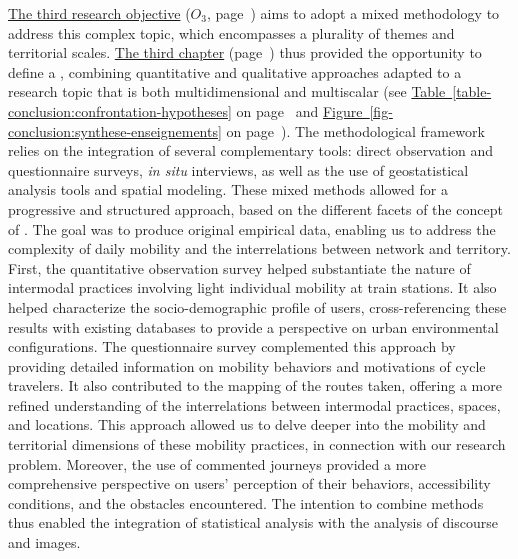 \begin{refsegment}
\hyperref[objectif-3]{The third research objective} (\(O_3\), page~\pageref{objectif-3}) aims to adopt a mixed methodology to address this complex topic, which encompasses a plurality of themes and territorial scales. \hyperref[chap3:titre]{The third chapter} (page~\pageref{chap3:titre}) thus provided the opportunity to define a , combining quantitative and qualitative approaches adapted to a research topic that is both multidimensional and multiscalar (see \hyperref[table-conclusion:confrontation-hypotheses]{Table~\ref{table-conclusion:confrontation-hypotheses}} on page~\pageref{table-conclusion:confrontation-hypotheses} and \hyperref[fig-conclusion:synthese-enseignements]{Figure~\ref{fig-conclusion:synthese-enseignements}} on page~\pageref{fig-conclusion:synthese-enseignements}). The methodological framework relies on the integration of several complementary tools: direct observation and questionnaire surveys, \textsl{in situ} interviews, as well as the use of geostatistical analysis tools and spatial modeling. These mixed methods allowed for a progressive and structured approach, based on the different facets of the concept of . The goal was to produce original empirical data, enabling us to address the complexity of daily mobility and the interrelations between network and territory. First, the quantitative observation survey helped substantiate the  nature of intermodal practices involving light individual mobility at train stations. It also helped characterize the socio-demographic profile of users, cross-referencing these results with existing databases to provide a perspective on urban environmental configurations. The questionnaire survey complemented this approach by providing detailed information on mobility behaviors and motivations of cycle travelers. It also contributed to the mapping of the routes taken, offering a more refined understanding of the interrelations between intermodal practices, spaces, and locations. This approach allowed us to delve deeper into the mobility and territorial dimensions of these mobility practices, in connection with our research problem. Moreover, the use of commented journeys provided a more comprehensive perspective on users' \gls{perception} of their behaviors, accessibility conditions, and the obstacles encountered. The intention to combine methods thus enabled the integration of statistical analysis with the analysis of discourse and images.%


\end{refsegment}
